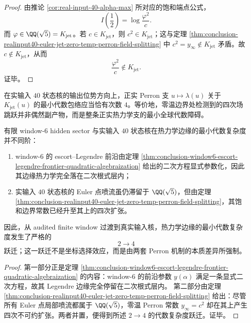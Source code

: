 \begin{proof}
由推论 \ref{cor:real-input-40-alpha-max} 所对应的饱和端点公式，
\[
I\!\left(\frac12\right)=\log\frac{\varphi^2}{c}.
\]
而 \(\varphi\in \QQ(\sqrt5)=K_{\mathrm{jet}}\)。若 \(c\in K_{\mathrm{jet}}\)，则 \(c^2\in K_{\mathrm{jet}}\)；这与定理 \ref{thm:conclusion-realinput40-euler-jet-zero-temp-perron-field-splitting} 中 \(c^2=y_\infty\notin K_{\mathrm{jet}}\) 矛盾。故 \(c\notin K_{\mathrm{jet}}\)，从而
\[
\frac{\varphi^2}{c}\notin K_{\mathrm{jet}}.
\]
证毕。
\end{proof}

\begin{conjecture}\label{conj:conclusion-realinput40-perron-branch-quartic-minimality}
在实输入 \(40\) 状态核的输出位势方向上，正实 Perron 支 \(u\mapsto \lambda(u)\) 关于 \(K_{\mathrm{jet}}(u)\) 的最小代数包络应当恰有次数 \(4\)。等价地，零温边界处检测到的四次场跳跃并非偶然副产物，而是整条正实热力学支的最小全球代数障碍。
\end{conjecture}

\begin{proposition}[有限窗与实输入核之间的代数复杂度跃迁]\label{prop:conclusion-window6-realinput40-algebraic-edge-complexity-jump}
有限 window-\(6\) hidden sector 与实输入 \(40\) 状态核在热力学边缘的最小代数复杂度并不同阶：
\begin{enumerate}
  \item window-\(6\) 的 escort--Legendre 前沿由定理 \ref{thm:conclusion-window6-escort-legendre-frontier-quadratic-algebraization} 给出的二次方程显式参数化，因此其边缘热力学完全落在二次根式层内；
  \item 实输入 \(40\) 状态核的 Euler 点喷流虽仍滞留于 \(\QQ(\sqrt5)\)，但由定理 \ref{thm:conclusion-realinput40-euler-jet-zero-temp-perron-field-splitting}，其饱和边界常数已经升至其上的四次扩张。
\end{enumerate}
因此，从 audited finite window 过渡到真实输入核，热力学边缘的最小代数复杂度发生了严格的
\[
2\longrightarrow 4
\]
跃迁；这一跃迁不是坐标选择效应，而是由两套 Perron 机制的本质差异所强制。
\end{proposition}

\begin{proof}
第一部分正是定理 \ref{thm:conclusion-window6-escort-legendre-frontier-quadratic-algebraization} 的内容：window-\(6\) 的前沿参数 \(y(\alpha)\) 满足一条显式二次方程，故其 Legendre 边缘完全停留在二次根式层内。
第二部分由定理 \ref{thm:conclusion-realinput40-euler-jet-zero-temp-perron-field-splitting} 给出：尽管所有 Euler 点局部喷流都属于 \(\QQ(\sqrt5)\)，零温 Perron 常数 \(y_\infty=c^2\) 却在其上产生四次不可约扩张。两者并置，便得到所述 \(2\to4\) 的代数复杂度跃迁。证毕。
\end{proof}

